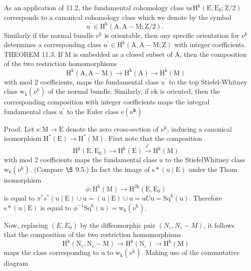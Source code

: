 \documentclass[10pt]{article}
\begin{document}
As an application of 11.2, the fundamental cohomology class $\mathrm{u} \epsilon \mathrm{H}^{\mathrm{k}}\left(\mathrm{E}, \mathrm{E}_{0} ; \mathrm{Z} / 2\right)$ corresponds to a canonical cohomology class which we denote by the symbol
$$
\mathrm{u}^{\prime} \in \mathrm{H}^{\mathrm{k}}(\mathrm{A}, \mathrm{A}-\mathrm{M} ; \mathrm{Z} / 2) \text {. }
$$
Similarly if the normal bundle $\nu^{\mathrm{k}}$ is orientable, then any specific orientation for $\nu^{\mathrm{k}}$ determines a corresponding class $\mathrm{u}^{\prime} \in \mathrm{H}^{\mathrm{k}}(\mathrm{A}, \mathrm{A}-\mathrm{M} ; \mathrm{Z})$ with integer coefficients. THEOREM 11.3. If $\mathrm{M}$ is embedded as a closed subset of $\mathrm{A}$, then the composition of the two restriction homomorphisms
$$
\mathrm{H}^{\mathrm{k}}(\mathrm{A}, \mathrm{A}-\mathrm{M}) \rightarrow \mathrm{H}^{\mathrm{k}}(\mathrm{A}) \rightarrow \mathrm{H}^{\mathrm{k}}(\mathrm{M})
$$
with mod 2 coefficients, maps the fundamental class $u^{\prime}$ to the top Stiefel-Whitney class $\mathrm{w}_{\mathrm{k}}\left(\nu^{k}\right)$ of the normal bundle. Similarly, if $\nu \mathrm{k}$ is oriented, then the corresponding composition with integer coefficients maps the integral fundamental class $\mathrm{u}^{\prime}$ to the Euler class $\mathrm{e}\left(\nu^{\mathbf{k}}\right)$

Proof. Let $\mathrm{s}: \mathrm{M} \rightarrow \mathrm{E}$ denote the zero cross-section of $\nu^{\mathrm{k}}$, inducing a canonical isomorphism $\mathrm{H}^{*}(\mathrm{E}) \rightarrow \mathrm{H}^{*}(\mathrm{M})$. First note that the composition
$$
\mathrm{H}^{\mathrm{k}}\left(\mathrm{E}, \mathrm{E}_{0}\right) \longrightarrow \mathrm{H}^{\mathrm{k}}(\mathrm{E}) \stackrel{\mathrm{s}^{*}}{\longrightarrow} \mathrm{H}^{\mathrm{k}}(\mathrm{M})
$$
with mod 2 coefficients maps the fundamental class $u$ to the StiefelWhitney class $\mathrm{w}_{\mathrm{k}}\left(\nu^{\mathrm{k}}\right)$. (Compare $\S$ 9.5.) In fact the image of $\mathrm{s} *(\mathrm{u} \mid \mathrm{E})$ under the Thom isomorphism
$$
\phi: \mathrm{H}^{\mathrm{k}}(\mathrm{M}) \rightarrow \mathrm{H}^{2 \mathrm{k}}\left(\mathrm{E}, \mathrm{E}_{0}\right)
$$
is equal to $\pi^{*} s^{*}(\mathrm{u} \mid \mathrm{E}) \cup \mathrm{u}=(\mathrm{u} \mid \mathrm{E}) \cup \mathrm{u}=\mathrm{u} U \mathrm{u}=\mathrm{Sq}^{\mathrm{k}}(\mathrm{u})$. Therefore $\mathrm{s} *(\mathrm{u} \mid \mathrm{E})$ is equal to $\phi^{-1} \mathrm{Sq}^{\mathrm{k}}(\mathrm{u})=\mathrm{w}_{\mathrm{k}}\left(\nu^{\mathrm{k}}\right)$.

Now, replacing $\left(E, E_{0}\right)$ by the diffeomorphic pair $\left(N_{\varepsilon}, N_{\varepsilon}-M\right)$, it follows that the composition of the two restriction homomorphisms
$$
\mathrm{H}^{\mathrm{k}}\left(\mathrm{N}_{\varepsilon}, \mathrm{N}_{\varepsilon}-\mathrm{M}\right) \rightarrow \mathrm{H}^{\mathrm{k}}\left(\mathrm{N}_{\varepsilon}\right) \rightarrow \mathrm{H}^{\mathrm{k}}(\mathrm{M})
$$
maps the class corresponding to $\mathrm{u}$ to $\mathrm{w}_{\mathrm{k}}\left(\nu^{\mathrm{k}}\right)$. Making use of the commutative diagram
\end{document}
